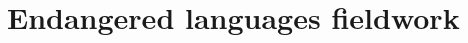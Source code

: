 \documentclass[11pt]{article}
\newcommand{\smalltodo}[2][]
    {\todo[caption={#2}, #1]
    {\tiny#2\normalsize}}
\begin{document}
%




\section{Endangered languages fieldwork}\label{sec:fieldwork}
\end{document}
